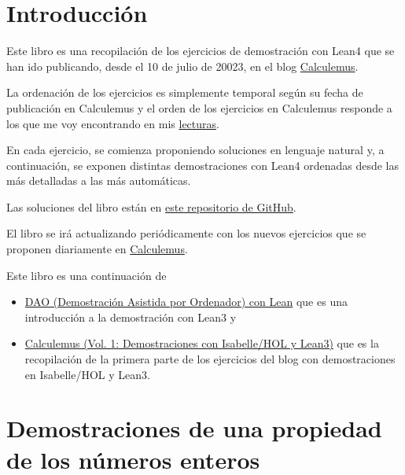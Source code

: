 

\chapter{Introducción}
\label{sec:org7f7e514}

Este libro es una recopilación de los ejercicios de demostración con
Lean4 que se han ido publicando, desde el 10 de julio de 20023, en el
blog \href{https://www.glc.us.es}{Calculemus}.

La ordenación de los ejercicios es simplemente temporal según su fecha
de publicación en Calculemus y el orden de los ejercicios en Calculemus
responde a los que me voy encontrando en mis \href{https://github.com/jaalonso/Lecturas\_GLC}{lecturas}.

En cada ejercicio, se comienza proponiendo soluciones en lenguaje
natural y, a continuación, se exponen distintas demostraciones con Lean4
ordenadas desde las más detalladas a las más automáticas.

Las soluciones del libro están en \href{https://github.com/jaalonso/Calculemus2}{este repositorio de GitHub}.

El libro se irá actualizando periódicamente con los nuevos ejercicios que se
proponen diariamente en \href{https://www.glc.us.es}{Calculemus}.

Este libro es una continuación de
\begin{itemize}
\item \href{https://raw.githubusercontent.com/jaalonso/DAO\_con\_Lean/master/DAO\_con\_Lean.pdf}{DAO (Demostración Asistida por Ordenador) con Lean} que es una
introducción a la demostración con Lean3 y
\item \href{https://raw.githubusercontent.com/jaalonso/Calculemus/master/Calculemus.pdf}{Calculemus (Vol. 1: Demostraciones con Isabelle/HOL y Lean3)} que es la
recopilación de la primera parte de los ejercicios del blog con
demostraciones en Isabelle/HOL y Lean3.
\end{itemize}

\chapter{Demostraciones de una propiedad de los números enteros}
\label{sec:org830c1c2}

